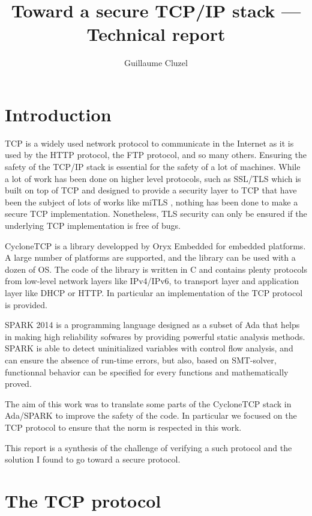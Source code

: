 \documentclass[a4paper, 10pt]{article}
\author{Guillaume Cluzel}
\title{Toward a secure TCP/IP stack --- Technical report}
\begin{document}
    \maketitle

    \tableofcontents

    \section{Introduction}

    TCP is a widely used network protocol to communicate in the Internet as
    it is used by the HTTP protocol, the FTP protocol, and so many others.
    Ensuring the safety of the TCP/IP stack is essential for the safety of
    a lot of machines. While a lot of work has been done on higher level
    protocols, such as SSL/TLS which is built on top of TCP and designed
    to provide a security layer to TCP that have been the subject of lots of
    works like miTLS \cite{}, nothing has been done to make a secure TCP
    implementation. Nonetheless, TLS security can only be ensured if the underlying
    TCP implementation is free of bugs.

    CycloneTCP is a library developped by Oryx Embedded for embedded platforms.
    A large number of platforms are supported, and the library can be used
    with a dozen of OS. The code of the library is written in C and contains
    plenty protocols from low-level network layers like IPv4/IPv6, to transport layer
    and application layer like DHCP or HTTP. In particular an implementation of
    the TCP protocol is provided.

    SPARK 2014 is a programming language designed as a subset of Ada that helps in
    making high reliability sofwares by providing powerful static analysis methods.
    SPARK is able to detect uninitialized variables with control flow analysis,
    and can ensure the absence of run-time errors,
    but also, based on SMT-solver, functionnal behavior can be specified for every
    functions and mathematically proved.

    The aim of this work was to translate some parts of the CycloneTCP stack
    in Ada/SPARK to improve the safety of the code. In particular we focused
    on the TCP protocol to ensure that the norm is respected in this work.

    This report is a synthesis of the challenge of verifying a such protocol
    and the solution I found to go toward a secure protocol.


    \section{The TCP protocol}
\end{document}
